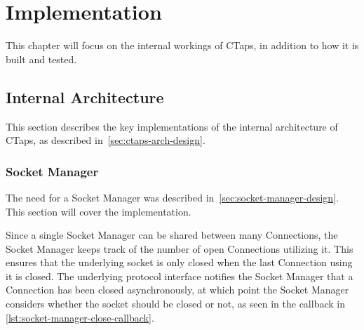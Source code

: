 \chapter{Implementation}\label{chap:impl}
This chapter will focus on the internal workings of CTaps,
in addition to how it is built and tested.

\section{Internal Architecture}
This section describes the key implementations of the internal
architecture of CTaps, as described in~\cref{sec:ctaps-arch-design}.

\subsection{Socket Manager} \label{sec:socketManager}
The need for a Socket Manager was described in~\cref{sec:socket-manager-design}.
This section will cover the implementation.

Since a single Socket Manager can be shared between many Connections,
the Socket Manager keeps track of the number of open Connections
utilizing it. This ensures that the underlying socket is only closed when
the last Connection using it is closed. The underlying protocol
interface notifies the Socket Manager that a Connection has
been closed asynchronously, at which point the Socket Manager
considers whether the socket should be closed or not, as seen
in the callback in
\cref{lst:socket-manager-close-callback}.

